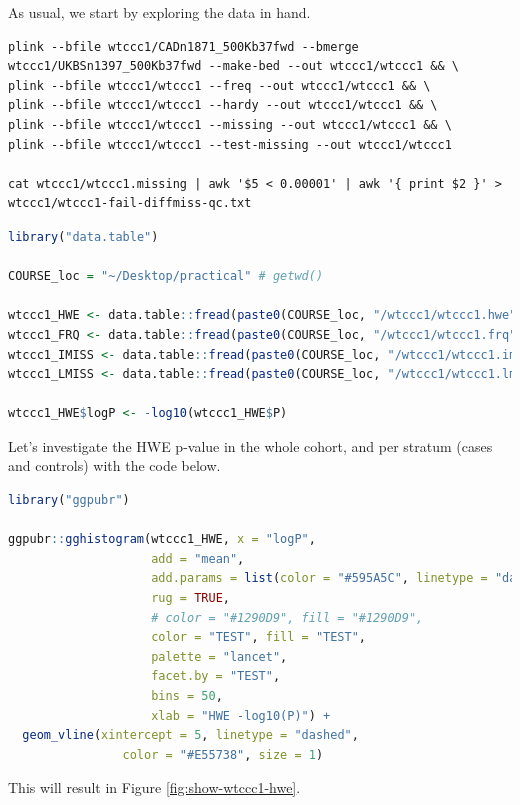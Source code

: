 \documentclass[
]{book}
\begin{document}
As usual, we start by exploring the data in hand.

\begin{lstlisting}
plink --bfile wtccc1/CADn1871_500Kb37fwd --bmerge wtccc1/UKBSn1397_500Kb37fwd --make-bed --out wtccc1/wtccc1 && \
plink --bfile wtccc1/wtccc1 --freq --out wtccc1/wtccc1 && \
plink --bfile wtccc1/wtccc1 --hardy --out wtccc1/wtccc1 && \
plink --bfile wtccc1/wtccc1 --missing --out wtccc1/wtccc1 && \
plink --bfile wtccc1/wtccc1 --test-missing --out wtccc1/wtccc1

cat wtccc1/wtccc1.missing | awk '$5 < 0.00001' | awk '{ print $2 }' > wtccc1/wtccc1-fail-diffmiss-qc.txt
\end{lstlisting}

\begin{lstlisting}[language=R]
library("data.table")

COURSE_loc = "~/Desktop/practical" # getwd()

wtccc1_HWE <- data.table::fread(paste0(COURSE_loc, "/wtccc1/wtccc1.hwe"))
wtccc1_FRQ <- data.table::fread(paste0(COURSE_loc, "/wtccc1/wtccc1.frq"))
wtccc1_IMISS <- data.table::fread(paste0(COURSE_loc, "/wtccc1/wtccc1.imiss"))
wtccc1_LMISS <- data.table::fread(paste0(COURSE_loc, "/wtccc1/wtccc1.lmiss"))

wtccc1_HWE$logP <- -log10(wtccc1_HWE$P)
\end{lstlisting}

Let's investigate the HWE p-value in the whole cohort, and per stratum (cases and controls) with the code below.

\begin{lstlisting}[language=R]
library("ggpubr")

ggpubr::gghistogram(wtccc1_HWE, x = "logP",
                    add = "mean",
                    add.params = list(color = "#595A5C", linetype = "dashed", size = 1),
                    rug = TRUE,
                    # color = "#1290D9", fill = "#1290D9",
                    color = "TEST", fill = "TEST",
                    palette = "lancet",
                    facet.by = "TEST",
                    bins = 50,
                    xlab = "HWE -log10(P)") +
  geom_vline(xintercept = 5, linetype = "dashed",
                color = "#E55738", size = 1)
\end{lstlisting}

This will result in Figure \ref{fig:show-wtccc1-hwe}.
\end{document}
